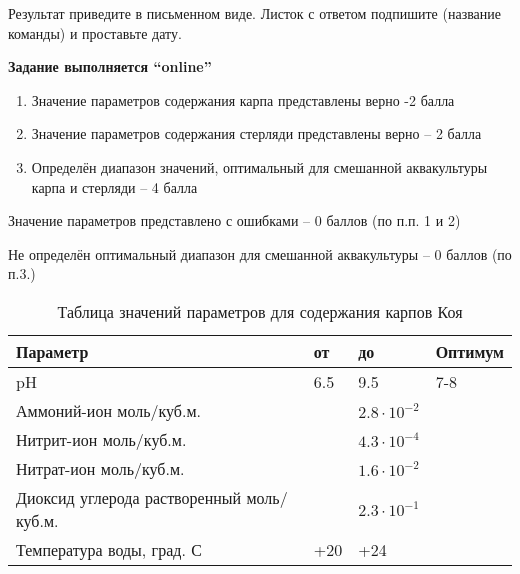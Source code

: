 
Результат приведите в письменном виде. Листок с ответом подпишите (название команды) и проставьте дату.

\textbf{Задание выполняется “online”}

\markSection

\begin{enumerate}
    \item Значение параметров содержания карпа представлены верно -2 балла
    \item Значение параметров содержания стерляди представлены верно – 2 балла
    \item Определён диапазон значений, оптимальный для смешанной аквакультуры карпа и стерляди – 4 балла
\end{enumerate}

Значение параметров представлено с ошибками – 0 баллов (по п.п. 1 и 2)

Не определён оптимальный диапазон для смешанной аквакультуры – 0 баллов (по п.3.)

\solutionSection

\begin{table}[H]
    \caption{Таблица значений параметров для содержания карпов Коя}
    \begin{tabular}{|l|l|l|l|}
        \hline
        Параметр &от&	до&	Оптимум \\
        \hline
        pH & 6.5 & 9.5 & 7-8 \\
        \hline
        Аммоний-ион моль/куб.м.	&	&$2.8 \cdot 10^{-2}$	&  \\
        \hline
        Нитрит-ион моль/куб.м.	&	&$4.3 \cdot 10^{-4}$&	\\
        \hline
        Нитрат-ион моль/куб.м. & &$1.6 \cdot 10^{-2}$	& \\
        \hline
        Диоксид углерода 
        растворенный моль/куб.м.	&	&$2.3 \cdot 10^{-1}$	& \\
        \hline
        Температура воды, град. С	&+20&	+24	& \\
        \hline
    \end{tabular}
\end{table}

